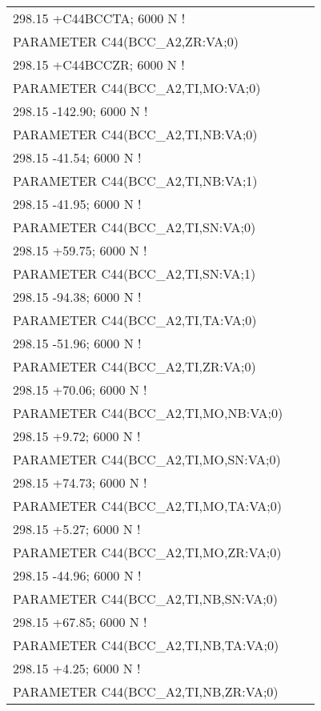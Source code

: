 \begin{longtable}[H]{ l l l }
	\multicolumn{3}{l}{298.15 +C44BCCTA; 6000 N !}\\
	PARAMETER C44(BCC\_A2,ZR:VA;0) & & \\
	\multicolumn{3}{l}{298.15 +C44BCCZR; 6000 N !}\\
	PARAMETER C44(BCC\_A2,TI,MO:VA;0) & & \\
	\multicolumn{3}{l}{298.15 -142.90;    6000 N !}\\
	PARAMETER C44(BCC\_A2,TI,NB:VA;0) & & \\
	\multicolumn{3}{l}{298.15 -41.54;     6000 N !}\\
	PARAMETER C44(BCC\_A2,TI,NB:VA;1) & & \\
	\multicolumn{3}{l}{298.15 -41.95;     6000 N !}\\
	PARAMETER C44(BCC\_A2,TI,SN:VA;0) & & \\
	\multicolumn{3}{l}{298.15 +59.75;     6000 N !}\\
	PARAMETER C44(BCC\_A2,TI,SN:VA;1) & & \\
	\multicolumn{3}{l}{298.15 -94.38;     6000 N !}\\
	PARAMETER C44(BCC\_A2,TI,TA:VA;0) & & \\
	\multicolumn{3}{l}{298.15 -51.96;     6000 N !}\\
	PARAMETER C44(BCC\_A2,TI,ZR:VA;0) & & \\
	\multicolumn{3}{l}{298.15 +70.06;     6000 N !}\\
	PARAMETER C44(BCC\_A2,TI,MO,NB:VA;0) & & \\
	\multicolumn{3}{l}{298.15 +9.72;      6000 N !}\\   
	PARAMETER C44(BCC\_A2,TI,MO,SN:VA;0) & & \\
	\multicolumn{3}{l}{298.15 +74.73;     6000 N !}\\    
	PARAMETER C44(BCC\_A2,TI,MO,TA:VA;0) & & \\
	\multicolumn{3}{l}{298.15 +5.27;      6000 N !}\\    
	PARAMETER C44(BCC\_A2,TI,MO,ZR:VA;0) & & \\
	\multicolumn{3}{l}{298.15 -44.96;     6000 N !}\\    
	PARAMETER C44(BCC\_A2,TI,NB,SN:VA;0) & & \\
	\multicolumn{3}{l}{298.15 +67.85;     6000 N !}\\    
	PARAMETER C44(BCC\_A2,TI,NB,TA:VA;0) & & \\
	\multicolumn{3}{l}{298.15 +4.25;      6000 N !}\\    
	PARAMETER C44(BCC\_A2,TI,NB,ZR:VA;0) & & \\

\end{longtable}
